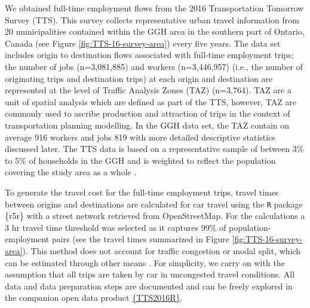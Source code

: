 \documentclass[]{elsarticle} %
\begin{document}
We obtained full-time employment flows from the 2016 Transportation
Tomorrow Survey (TTS). This survey collects representative urban travel
information from 20 municipalities contained within the GGH area in the
southern part of Ontario, Canada (see Figure
\ref{fig:TTS-16-survey-area}) \citep{data_management_group_tts_2018}
every five years. The data set includes origin to destination flows
associated with full-time employment trips; the number of jobs
(n=3,081,885) and workers (n=3,446,957) (i.e., the number of originating
trips and destination trips) at each origin and destination are
represented at the level of Traffic Analysis Zones (TAZ) (n=3,764). TAZ
are a unit of spatial analysis which are defined as part of the TTS,
however, TAZ are commonly used to ascribe production and attraction of
trips in the context of transportation planning modelling. In the GGH
data set, the TAZ contain on average 916 workers and jobs 819 with more
detailed descriptive statistics discussed later. The TTS data is based
on a representative sample of between 3\% to 5\% of households in the
GGH and is weighted to reflect the population covering the study area as
a whole \citep{data_management_group_tts_2018}.

To generate the travel cost for the full-time employment trips, travel
times between origins and destinations are calculated for car travel
using the \texttt{R} package \{r5r\} \citep{r5r_2021} with a street
network retrieved from OpenStreetMap. For the calculations a 3 hr travel
time threshold was selected as it captures 99\% of population-employment
pairs (see the travel times summarized in Figure
\ref{fig:TTS-16-survey-area}). This method does not account for traffic
congestion or modal split, which can be estimated through other means
\citep[e.g.,][]{allen_suburbanization_2021, higgins2021changes}. For
simplicity, we carry on with the assumption that all trips are taken by
car in uncongested travel conditions. All data and data preparation
steps are documented and can be freely explored in the companion open
data product \href{https://soukhova.github.io/TTS2016R/}{\{TTS2016R\}}.
\end{document}

